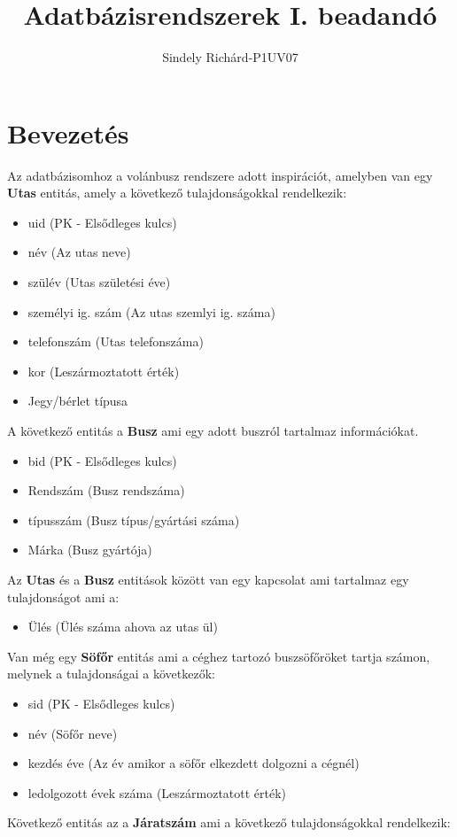 \documentclass[12pt]{article}
\author{Sindely Richárd-P1UV07}
\title{Adatbázisrendszerek I. beadandó}
\begin{document}
\maketitle
\newpage
\tableofcontents
\newpage
\section{Bevezetés}
\label{bev}
Az adatbázisomhoz a volánbusz rendszere adott inspirációt, amelyben van egy \textbf{Utas} entitás, amely a következő tulajdonságokkal rendelkezik:
\begin{itemize}
\item uid (PK - Elsődleges kulcs)
\item név (Az utas neve)
\item szülév (Utas születési éve)
\item személyi ig. szám (Az utas szemlyi ig. száma)
\item telefonszám (Utas telefonszáma)
\item kor (Leszármoztatott érték)
\item Jegy/bérlet típusa
\end{itemize}
A következő entitás a \textbf{Busz} ami egy adott buszról tartalmaz információkat.
\begin{itemize}
\item bid (PK - Elsődleges kulcs)
\item Rendszám (Busz rendszáma)
\item típusszám (Busz típus/gyártási száma)
\item Márka (Busz gyártója)
\end{itemize}
Az \textbf{Utas} és a \textbf{Busz} entitások között van egy kapcsolat ami tartalmaz egy tulajdonságot ami a:
\begin{itemize}
\item Ülés (Ülés száma ahova az utas ül)
\end{itemize}
Van még egy \textbf{Söfőr} entitás ami a céghez tartozó buszsöfőröket tartja számon, melynek a tulajdonságai a következők:
\begin{itemize}
\item sid (PK - Elsődleges kulcs)
\item név (Söfőr neve)
\item kezdés éve (Az év amikor a söfőr elkezdett dolgozni a cégnél)
\item ledolgozott évek száma (Leszármoztatott érték)
\end{itemize}
Következő entitás az a \textbf{Járatszám} ami a következő tulajdonságokkal rendelkezik:
\end{document}
